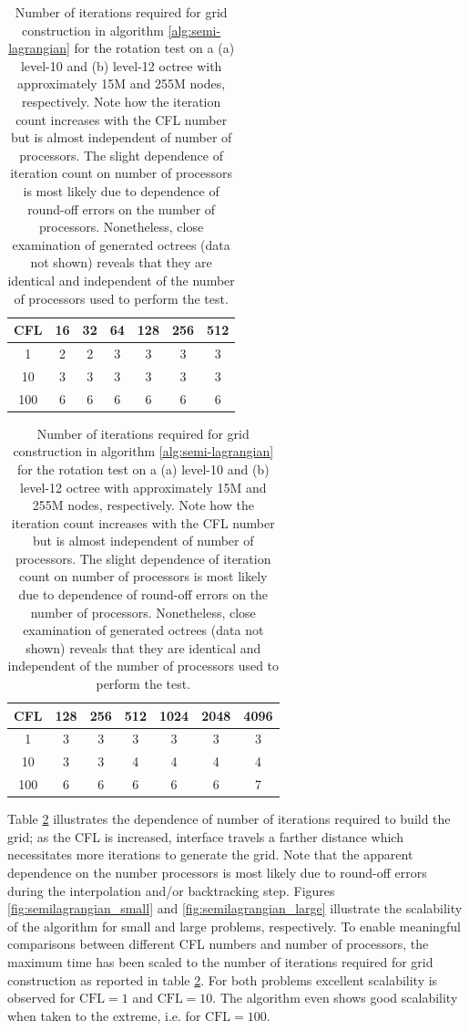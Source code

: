 \begin{table}[htbp]
	\begin{minipage}{.5\linewidth}
		\begin{center}
		\begin{tabular}{|c|cccccc|}
			\hline
				CFL & 16 & 32 & 64 & 128 & 256 & 512 \\
				\hline
				1   & 2 & 2 & 3 & 3 & 3 & 3 \\
				10  & 3 & 3 & 3 & 3 & 3 & 3 \\
				100 & 6 & 6 & 6 & 6 & 6 & 6 \\
			\hline
		\end{tabular}
		\caption*{(a) $l_\text{max} = 10$}
		\end{center}
	\end{minipage}%
	\begin{minipage}{.5\linewidth}
		\begin{center}
		\begin{tabular}{|c|cccccc|}
			\hline
				CFL & 128 & 256 & 512 & 1024 & 2048 & 4096 \\
			\hline
				1   & 3 & 3 & 3 & 3 & 3 & 3 \\
				10  & 3 & 3 & 4 & 4 & 4 & 4 \\
				100 & 6 & 6 & 6 & 6 & 6 & 7 \\
			\hline
		\end{tabular}
		\caption*{(b) $l_\text{max} = 12$}
		\end{center}
	\end{minipage}	
	\caption{Number of iterations required for grid construction in algorithm \ref{alg:semi-lagrangian} for the rotation test on a (a) level-10 and (b) level-12 octree with approximately 15M and 255M nodes, respectively. Note how the iteration count increases with the CFL number but is almost independent of number of processors. The slight dependence of iteration count on number of processors is most likely due to dependence of round-off errors on the number of processors. Nonetheless, close examination of generated octrees (data not shown) reveals that they are identical and independent of the number of processors used to perform the test.}
	\label{tab:semilagrangian}
\end{table}

Table \ref{tab:semilagrangian} illustrates the dependence of number of iterations required to build the grid; as the CFL is increased, interface travels a farther distance which necessitates more iterations to generate the grid. Note that the apparent dependence on the number processors is most likely due to round-off errors during the interpolation and/or backtracking step. Figures \ref{fig:semilagrangian_small} and \ref{fig:semilagrangian_large} illustrate the scalability of the algorithm for small and large problems, respectively. To enable meaningful comparisons between different CFL numbers and number of processors, the maximum time has been scaled to the number of iterations required for grid construction as reported in table \ref{tab:semilagrangian}. For both problems excellent scalability is observed for $\text{CFL} = 1$ and $\text{CFL} = 10$. The algorithm even shows good scalability when taken to the extreme, i.e. for $\text{CFL} = 100$.

